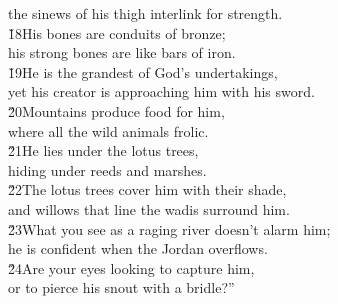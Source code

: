 \begin{poetry}
\poemll    the sinews of his thigh interlink for strength. \\
\poeml \v{18}His bones are conduits of bronze; \\
\poemll    his strong bones are like bars of iron. \\
\poeml \v{19}He is the grandest of God's undertakings, \\
\poemll    yet his creator is approaching him with his sword. \\
\poeml \v{20}Mountains produce food for him, \\
\poemll    where all the wild animals frolic. \\
\poeml \v{21}He lies under the lotus trees, \\
\poemll    hiding under reeds and marshes. \\
\poeml \v{22}The lotus trees cover him with their shade, \\
\poemll    and willows that line the wadis surround him. \\
\poeml \v{23}What you see as a raging river doesn't alarm him; \\
\poemll    he is confident when the Jordan overflows. \\
\poeml \v{24}Are your eyes looking to capture him, \\
\poemll    or to pierce his snout with a bridle?''
\end{poetry}

